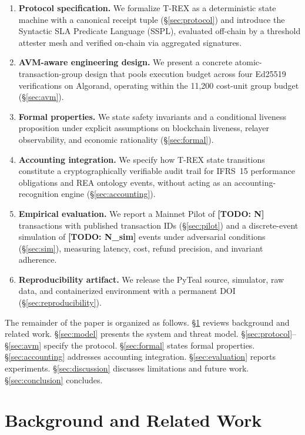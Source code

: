\documentclass[journal]{IEEEtran}
\newcommand{\TODO}[1]{{\color{red}\textbf{[TODO: #1]}}}
\begin{document}
\begin{enumerate}[label=\textbf{C\arabic*.},leftmargin=*]
    \item \textbf{Protocol specification.} We formalize T-REX as a deterministic state machine with a canonical receipt tuple (\S\ref{sec:protocol}) and introduce the Syntactic SLA Predicate Language (SSPL), evaluated off-chain by a threshold attester mesh and verified on-chain via aggregated signatures.
    \item \textbf{AVM-aware engineering design.} We present a concrete atomic-transaction-group design that pools execution budget across four Ed25519 verifications on Algorand, operating within the 11,200 cost-unit group budget (\S\ref{sec:avm}).
    \item \textbf{Formal properties.} We state safety invariants and a conditional liveness proposition under explicit assumptions on blockchain liveness, relayer observability, and economic rationality (\S\ref{sec:formal}).
    \item \textbf{Accounting integration.} We specify how T-REX state transitions constitute a cryptographically verifiable audit trail for IFRS~15 performance obligations and REA ontology events, without acting as an accounting-recognition engine (\S\ref{sec:accounting}).
    \item \textbf{Empirical evaluation.} We report a Mainnet Pilot of \TODO{N} transactions with published transaction IDs (\S\ref{sec:pilot}) and a discrete-event simulation of \TODO{N\_sim} events under adversarial conditions (\S\ref{sec:sim}), measuring latency, cost, refund precision, and invariant adherence.
    \item \textbf{Reproducibility artifact.} We release the PyTeal source, simulator, raw data, and containerized environment with a permanent DOI (\S\ref{sec:reproducibility}).
\end{enumerate}

\noindent The remainder of the paper is organized as follows. \S\ref{sec:background} reviews background and related work. \S\ref{sec:model} presents the system and threat model. \S\ref{sec:protocol}--\S\ref{sec:avm} specify the protocol. \S\ref{sec:formal} states formal properties. \S\ref{sec:accounting} addresses accounting integration. \S\ref{sec:evaluation} reports experiments. \S\ref{sec:discussion} discusses limitations and future work. \S\ref{sec:conclusion} concludes.

\section{Background and Related Work}
\label{sec:background}
\end{document}

